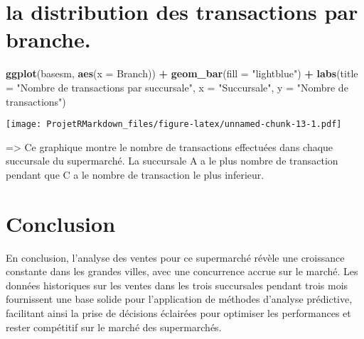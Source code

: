 \documentclass[
]{article}
\newenvironment{Shaded}{\begin{snugshade}}{\end{snugshade}}
\newcommand{\AttributeTok}[1]{\textcolor[rgb]{0.13,0.29,0.53}{#1}}
\newcommand{\FunctionTok}[1]{\textcolor[rgb]{0.13,0.29,0.53}{\textbf{#1}}}
\newcommand{\NormalTok}[1]{#1}
\newcommand{\SpecialCharTok}[1]{\textcolor[rgb]{0.81,0.36,0.00}{\textbf{#1}}}
\newcommand{\StringTok}[1]{\textcolor[rgb]{0.31,0.60,0.02}{#1}}
\begin{document}
\hypertarget{la-distribution-des-transactions-par-branche.}{%
\section{la distribution des transactions par
branche.}\label{la-distribution-des-transactions-par-branche.}}

\begin{Shaded}
\begin{Highlighting}[]
\FunctionTok{ggplot}\NormalTok{(basesm, }\FunctionTok{aes}\NormalTok{(}\AttributeTok{x =}\NormalTok{ Branch)) }\SpecialCharTok{+}
  \FunctionTok{geom\_bar}\NormalTok{(}\AttributeTok{fill =} \StringTok{"lightblue"}\NormalTok{) }\SpecialCharTok{+}
  \FunctionTok{labs}\NormalTok{(}\AttributeTok{title =} \StringTok{"Nombre de transactions par succursale"}\NormalTok{,}
       \AttributeTok{x =} \StringTok{"Succursale"}\NormalTok{,}
       \AttributeTok{y =} \StringTok{"Nombre de transactions"}\NormalTok{)}
\end{Highlighting}
\end{Shaded}

\texttt{[image: ProjetRMarkdown\_files/figure-latex/unnamed-chunk-13-1.pdf]}

=\textgreater{} Ce graphique montre le nombre de transactions effectuées
dans chaque succursale du supermarché. La succursale A a le plus nombre
de transaction pendant que C a le nombre de transaction le plus
inferieur.

\hypertarget{conclusion}{%
\section{Conclusion}\label{conclusion}}

En conclusion, l'analyse des ventes pour ce supermarché révèle une
croissance constante dans les grandes villes, avec une concurrence
accrue sur le marché. Les données historiques sur les ventes dans les
trois succursales pendant trois mois fournissent une base solide pour
l'application de méthodes d'analyse prédictive, facilitant ainsi la
prise de décisions éclairées pour optimiser les performances et rester
compétitif sur le marché des supermarchés.
\end{document}
